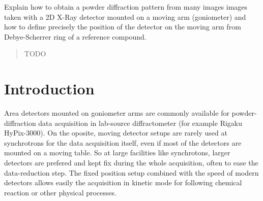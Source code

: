 \documentclass{iucr}              %
\begin{document}

\maketitle                        %

\begin{synopsis}
Explain how to obtain a powder diffraction pattern from
many images images taken with a 2D X-Ray detector mounted on a moving arm
(goniometer) and how to define precisely the position of the detector on the
moving arm from Debye-Scherrer ring of a reference compound.
\end{synopsis}

\begin{abstract}
TODO
\end{abstract}




\section{Introduction}

Area detectors mounted on goniometer arms are commonly available for
powder-diffraction data acquisition in lab-source diffractometer (for example
Rigaku HyPix-3000).
On the oposite, moving detector setups are rarely used at synchrotrons for
the data acquisition itself, even if most of the detectors are mounted on a
moving table.
So at large facilities like synchrotons, larger detectors are 
prefered and kept fix during the whole acquisition, often to ease the
data-reduction step.
The fixed position setup combined with the speed of modern detectors allows
easily the acquisition in kinetic mode for following chemical reaction or other
physical processes.
\end{document}
